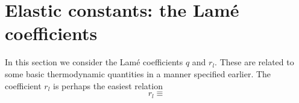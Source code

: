 \section{Elastic constants: the Lam\'e coefficients}
In this section we consider the Lam\'e coefficients $q$ and $r_l$. These are related to some basic thermodynamic quantities in a manner specified earlier. The coefficient $r_l$ is perhaps the easiest relation
\begin{equation}
r_l \equiv 
\label{eq:q_lame}
\end{equation}